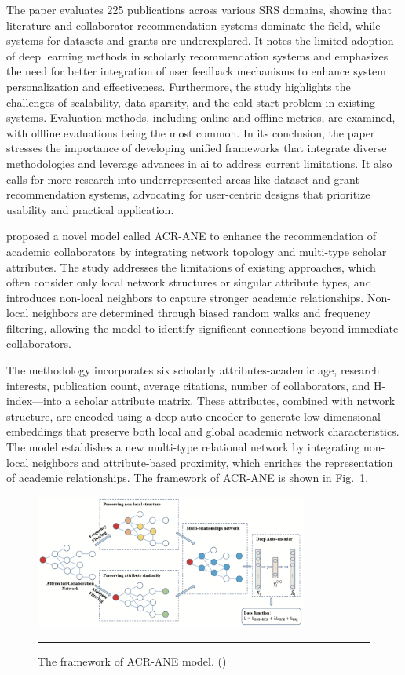 The paper evaluates 225 publications across various SRS domains, showing that literature and collaborator recommendation systems dominate the field, while systems for datasets and grants are underexplored.
It notes the limited adoption of deep learning methods in scholarly recommendation systems and emphasizes the need for better integration of user feedback mechanisms to enhance system personalization and effectiveness.
Furthermore, the study highlights the challenges of scalability, data sparsity, and the cold start problem in existing systems.
Evaluation methods, including online and offline metrics, are examined, with offline evaluations being the most common.
In its conclusion, the paper stresses the importance of developing unified frameworks that integrate diverse methodologies and leverage advances in \gls{ai} to address current limitations.
It also calls for more research into underrepresented areas like dataset and grant recommendation systems, advocating for user-centric designs that prioritize usability and practical application.

\textcite{Du2022} proposed a novel model called ACR-ANE to enhance the recommendation of academic collaborators by integrating network topology and multi-type scholar attributes.
The study addresses the limitations of existing approaches, which often consider only local network structures or singular attribute types, and introduces non-local neighbors to capture stronger academic relationships.
Non-local neighbors are determined through biased random walks and frequency filtering, allowing the model to identify significant connections beyond immediate collaborators.

The methodology incorporates six scholarly attributes-academic age, research interests, publication count, average citations, number of collaborators, and H-index—into a scholar attribute matrix.
These attributes, combined with network structure, are encoded using a deep auto-encoder to generate low-dimensional embeddings that preserve both local and global academic network characteristics.
The model establishes a new multi-type relational network by integrating non-local neighbors and attribute-based proximity, which enriches the representation of academic relationships.
The framework of ACR-ANE is shown in Fig.~\ref{fig:acr-ane}.

\begin{figure}[htbp]
    \centering
 \includegraphics[width=0.8\textwidth]{03_Figures/literature-review/academic-collaborator-recommendation-framework.png}
     \rule{35em}{0.5pt}
    \caption{The framework of ACR-ANE model. (\textcite{Du2022})}
 \label{fig:acr-ane}
\end{figure}


